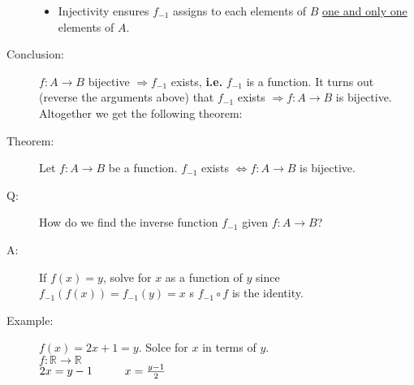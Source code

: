 \documentclass[10pt]{article}
\begin{document}
\begin{description}
\begin{itemize}
			\item Injectivity ensures $f_{-1}$ assigns to each elements of $B$ \underline{one and only one} elements of $A$.
		\end{itemize}
		\item[Conclusion:] $f:A \rightarrow B$ bijective $\Rightarrow f_{-1}$ exists, \textbf{i.e.} $f_{-1} $ is a function. It turns out (reverse the arguments above) that $f_{-1}$ exists $\Rightarrow f:A \rightarrow B$ is bijective. \\
		Altogether we get the following theorem:
		\item[Theorem:] Let $f:A \rightarrow B$ be a function. $f_{-1}$ exists $\Leftrightarrow f:A \rightarrow B$ is bijective.
		\item[Q:] How do we find the inverse function $f_{-1}$ given $f: A \rightarrow B$?
		\item[A:] If $f(x)=y$, solve for $x$ as a function of $y$ since $f_{-1}(f(x))=f_{-1}(y)=x$ s $f_{-1} \circ f$ is the identity.
		\item[Example:] $f(x)=2x+1=y$. Solce for $x$ in terms of $y$. \\
		$f: \mathbb{R} \rightarrow \mathbb{R}$ \\
		$2x = y-1 \hspace{10mm} x = \frac{y-1}{2}$
	\end{description}
	
\end{document}
